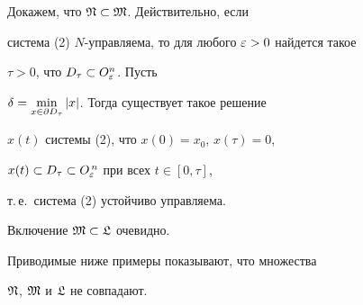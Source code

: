 \begin{pf}


Докажем, что $\frak N\subset\frak M$. Действительно, если


система (2) $N$-управляема, то для любого $\varepsilon>0$ найдется такое


$\tau>0$, что $D_{\tau}\subset O_{\varepsilon}^n$. Пусть


$\delta=\min\limits_{x\in\partial D_{\tau}} |x|$. Тогда существует такое решение


$x(t)$ системы (2), что $x(0)=x_0$, $x(\tau)=0$,


$x(t)\subset D_{\tau}\subset O_{\varepsilon}^{\,n}$ при всех $t\in[0,\tau]$,


т.\,е.~система (2) устойчиво управляема.





Включение $\frak M\subset\frak L$ очевидно.


\end{pf}





Приводимые ниже примеры показывают, что множества


$\frak N$, $\frak M$ и $\frak L$ не совпадают.





